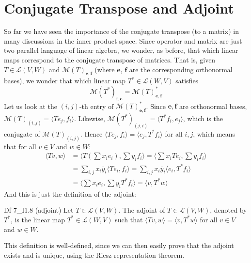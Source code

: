 \documentclass{article}
\begin{document}
\section{Conjugate Transpose and Adjoint}
So far we have seen the importance of the conjugate transpose (to a matrix) in many discussions in the inner product space. Since operator and matrix are just two parallel language of linear algebra, we wonder, as before, that which linear maps correspond to the conjugate transpose of matrices. That is, given $T\in\mathcal{L}(V, W)$ and $\mathcal{M}(T)_{\pmb{e}, \pmb{f}}$ (where $\pmb{e}$, $\pmb{f}$ are the corresponding orthonormal bases), we wonder that which linear map $T^\ast\in\mathcal{L}(W, V)$ satisfies 
$$\mathcal{M}(T^\ast)_{\pmb{f}, \pmb{e}} = \mathcal{M}(T)_{\pmb{e}, \pmb{f}}^\ast$$
Let us look at the $(i,j)$-th entry of $\mathcal{M}(T)_{\pmb{e}, \pmb{f}}^\ast$. Since $\pmb{e}, \pmb{f}$ are orthonormal bases, $\mathcal{M}(T)_{(i,j)} = \langle Te_j, f_i\rangle$. Likewise, $\mathcal{M}(T^\ast)_{(j,i)} = \langle T^\ast f_i, e_j\rangle$, which is the conjugate of $\mathcal{M}(T)_{(i,j)}$. Hence $\langle Te_j, f_i\rangle = \langle e_j, T^\ast f_i\rangle$ for all $i, j$, which means that for all $v\in V$ and $w\in W$:
$$
\begin{aligned}
    \langle Tv, w\rangle &= \langle T\left(\sum x_ie_i\right), \sum y_if_i\rangle = \langle \sum x_iTe_i, \sum y_if_i\rangle \\
    &= \sum_{i,j} x_i\overline{y}_i\langle Te_i, f_i\rangle = \sum_{i,j} x_i\overline{y}_i\langle e_i, T^\ast f_i\rangle \\
    &= \langle \sum x_ie_i, \sum y_iT^\ast f_i\rangle = \langle v, T^\ast w\rangle
\end{aligned}
$$
And this is just the definition of the adjoint:
\begin{Df}{Df 7\_I1.8 (adjoint)}
    Let $T\in\mathcal{L}(V, W)$. The adjoint of $T\in\mathcal{L}(V, W)$, denoted by $T^\ast$, is the linear map $T^\ast\in\mathcal{L}(W, V)$ such that $\langle Tv, w\rangle = \langle v, T^\ast w\rangle$ for all $v\in V$ and $w\in W$.
\end{Df}
\textcolor{Th}{This definition is well-defined, since we can then easily prove that the adjoint exists and is unique, using the Riesz representation theorem.}
\end{document}
